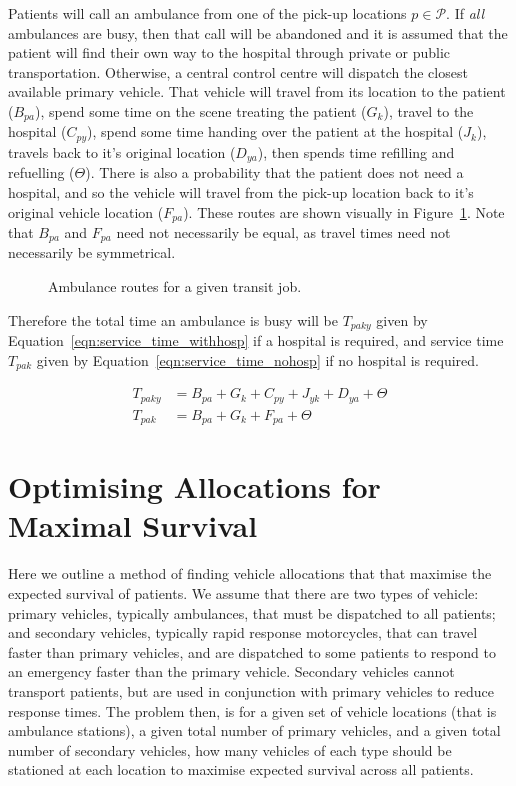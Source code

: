 \documentclass[preprint,12pt]{elsarticle}
\begin{document}
Patients will call an ambulance from one of the pick-up locations
$p \in \mathcal{P}$. If \textit{all} ambulances are busy, then that call will be
abandoned and it is assumed that the patient will find their own way to the
hospital through private or public transportation. Otherwise, a central control
centre will dispatch the closest available primary vehicle. That vehicle will
travel from its location to the patient ($B_{pa}$), spend some time on the scene
treating the patient ($G_k$), travel to the hospital ($C_{py}$), spend some time
handing over the patient at the hospital ($J_k$), travels back to it's original
location ($D_{ya}$), then spends time refilling and refuelling ($\Theta$).
There is also a probability that the patient does not need a hospital, and so
the vehicle will travel from the pick-up location back to it's original vehicle
location ($F_{pa}$). These routes are shown visually in
Figure~\ref{fig:travel_routes}. Note that $B_{pa}$ and $F_{pa}$ need not
necessarily be equal, as travel times need not necessarily be symmetrical.

\begin{figure}
    \centering
    
    \caption{Ambulance routes for a given transit job.}
    \label{fig:travel_routes}
\end{figure}

Therefore the total time an ambulance is busy will be $T_{paky}$ given by
Equation~\ref{eqn:service_time_withhosp} if a hospital is required, and
service time $T_{pak}$ given by Equation~\ref{eqn:service_time_nohosp} if no
hospital is required.

\begin{align}
T_{paky} &= B_{pa} + G_k + C_{py} + J_{yk} + D_{ya} + \Theta \label{eqn:service_time_withhosp} \\
T_{pak} &= B_{pa} + G_k + F_{pa} + \Theta \label{eqn:service_time_nohosp}
\end{align}


\section{Optimising Allocations for Maximal Survival}\label{sec:optimising}
Here we outline a method of finding vehicle allocations that that maximise the
expected survival of patients.
We assume that there are two types of vehicle: primary vehicles, typically
ambulances, that must be dispatched to all patients; and secondary vehicles,
typically rapid response motorcycles, that can travel faster than primary
vehicles, and are dispatched to some patients to respond to an emergency
faster than the primary vehicle. Secondary vehicles cannot transport patients,
but are used in conjunction with primary vehicles to reduce response times.
The problem then, is for a given set of vehicle locations (that is ambulance
stations), a given total number of primary vehicles, and a given total number
of secondary vehicles, how many vehicles of each type should be stationed at
each location to maximise expected survival across all patients.
\end{document}
